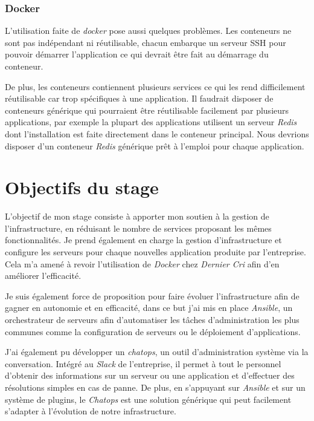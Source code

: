 \documentclass[12pt,a4paper]{article}
\begin{document}
  \subsubsection{Docker}\label{docker}

  L'utilisation faite de \emph{docker} pose aussi quelques problèmes. Les
  conteneurs ne sont pas indépendant ni réutilisable, chacun embarque un
  serveur SSH pour pouvoir démarrer l'application ce qui devrait être fait
  au démarrage du conteneur.

  \bigskip

  De plus, les conteneurs contiennent plusieurs services ce qui les rend
  difficilement réutilisable car trop spécifiques à une application. Il
  faudrait disposer de conteneurs générique qui pourraient être
  réutilisable facilement par plusieurs applications, par exemple la
  plupart des applications utilisent un serveur \emph{Redis} dont
  l'installation est faite directement dans le conteneur principal. Nous
  devrions disposer d'un conteneur \emph{Redis} générique prêt à l'emploi
  pour chaque application.

  \newpage

  \section{Objectifs du stage}\label{objectifs-du-stage}

  L'objectif de mon stage consiste à apporter mon soutien à la gestion de
  l'infrastructure, en réduisant le nombre de services proposant les mêmes
  fonctionnalités. Je prend également en charge la gestion
  d'infrastructure et configure les serveurs pour chaque nouvelles
  application produite par l'entreprise. Cela m'a amené à revoir
  l'utilisation de \emph{Docker} chez \emph{Dernier Cri} afin d'en
  améliorer l'efficacité.

  \bigskip

  Je suis également force de proposition pour faire évoluer
  l'infrastructure afin de gagner en autonomie et en efficacité, dans ce
  but j'ai mis en place \emph{Ansible}, un orchestrateur de serveurs afin
  d'automatiser les tâches d'administration les plus communes comme la
  configuration de serveurs ou le déploiement d'applications.

  \bigskip

  J'ai également pu développer un \emph{chatops}, un outil
  d'administration système via la conversation. Intégré au \emph{Slack} de
  l'entreprise, il permet à tout le personnel d'obtenir des informations
  sur un serveur ou une application et d'effectuer des résolutions simples
  en cas de panne. De plus, en s'appuyant sur \emph{Ansible} et sur un
  système de plugins, le \emph{Chatops} est une solution générique qui
  peut facilement s'adapter à l'évolution de notre infrastructure.
\end{document}
